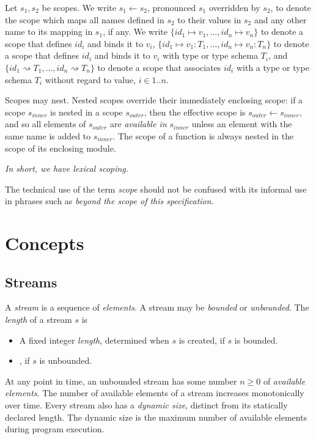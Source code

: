 \documentclass{article}
\begin{document}
Let $s_1, s_2$ be scopes.  We write $s_1 \leftarrow s_2$, pronounced $s_1$ overridden by $s_2$, to denote the scope  which maps all names defined in $s_2$ to their values in $s_2$ and any other name to its mapping in $s_1$, if any. We write $\{id_1 \mapsto v_1, \ldots, id_n \mapsto v_n\}$ to denote a scope that defines $id_i$ and binds it to $v_i$,  $\{id_1 \mapsto v_1: T_1, \ldots, id_n \mapsto  v_n: T_n\}$ to denote a scope that defines $id_i$ and binds it to $v_i$ with type or type schema $T_i$, and $\{id_1 \rightsquigarrow  T_1, \ldots, id_n \rightsquigarrow T_n\}$ to denote a scope that associates $id_i$ with a type or type schema $T_i $ without regard to value, $i \in 1..n$.

Scopes may nest. Nested scopes override their immediately enclosing scope: if a scope $s_{inner}$ is nested in a scope $s_{outer}$, then the effective scope is $s_{outer} \leftarrow s_{inner}$, and so all elements of $s_{outer}$ are {\em available in} $s_{inner}$ unless an element with the same name is added to $s_{inner}$.
The scope of a function is always nested in the scope of its enclosing module. 

{\em
In short, we have lexical scoping.
}

The technical use of the term {\em scope} should not be confused with its informal use in phrases such as {\em beyond the scope of this specification.}



\section{Concepts}
\label{concepts}

\subsection{Streams}
\label{streams}

A {\em stream} is a sequence of {\em elements}.  A stream may be {\em bounded} or {\em unbounded}. The {\em length} of a stream $s$  is 
\begin{itemize}
\item A fixed integer {\em length}, determined when $s$ is created, if $s$ is bounded.
\item \QUESTIONMARK{}, if $s$ is unbounded.
\end{itemize}

At any point in time, an unbounded stream has some number $n \ge 0$ of {\em available elements}. The number of available elements of a stream increases monotonically over time. Every stream also has a {\em dynamic size}, distinct from its statically declared length. The dynamic size is the maximum number of available elements during program execution.
\end{document}

